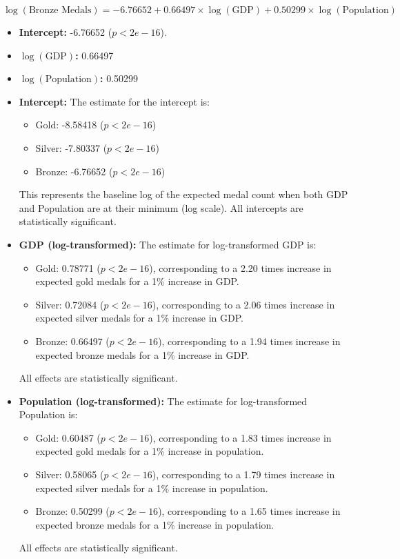 \documentclass[a4paper,12pt]{article}
\begin{document}
\[
\log(\text{Bronze Medals}) = -6.76652 + 0.66497 \times \log(\text{GDP}) + 0.50299 \times \log(\text{Population})
\]
\begin{itemize}
	\item \textbf{Intercept:} -6.76652 (\(p < 2e-16\)).
	\item \textbf{\(\log(\text{GDP})\):} 0.66497 
	\item \textbf{\(\log(\text{Population})\):} 0.50299 
\end{itemize}










\begin{itemize}
	\item \textbf{Intercept:} The estimate for the intercept is:
	\begin{itemize}
		\item Gold: -8.58418 (\(p < 2e-16\))
		\item Silver: -7.80337 (\(p < 2e-16\))
		\item Bronze: -6.76652 (\(p < 2e-16\))
	\end{itemize}
	This represents the baseline log of the expected medal count when both GDP and Population are at their minimum (log scale). All intercepts are statistically significant.
	
	\item \textbf{GDP (log-transformed):} The estimate for log-transformed GDP is:
	\begin{itemize}
		\item Gold: 0.78771 (\(p < 2e-16\)), corresponding to a 2.20 times increase in expected gold medals for a 1\% increase in GDP.
		\item Silver: 0.72084 (\(p < 2e-16\)), corresponding to a 2.06 times increase in expected silver medals for a 1\% increase in GDP.
		\item Bronze: 0.66497 (\(p < 2e-16\)), corresponding to a 1.94 times increase in expected bronze medals for a 1\% increase in GDP.
	\end{itemize}
	All effects are statistically significant.
	
	\item \textbf{Population (log-transformed):} The estimate for log-transformed Population is:
	\begin{itemize}
		\item Gold: 0.60487 (\(p < 2e-16\)), corresponding to a 1.83 times increase in expected gold medals for a 1\% increase in population.
		\item Silver: 0.58065 (\(p < 2e-16\)), corresponding to a 1.79 times increase in expected silver medals for a 1\% increase in population.
		\item Bronze: 0.50299 (\(p < 2e-16\)), corresponding to a 1.65 times increase in expected bronze medals for a 1\% increase in population.
	\end{itemize}
	All effects are statistically significant.
\end{itemize}
\end{document}
